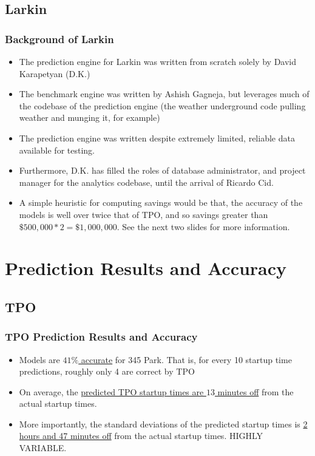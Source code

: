 \documentclass{beamer}
\begin{document}
\subsection{Larkin}
\begin{frame}
	\frametitle{Background of Larkin}
	\begin{itemize}
	\item The prediction engine for Larkin was written from scratch solely by David Karapetyan (D.K.)
	\item The benchmark engine was written by Ashish Gagneja, but leverages much of the codebase
		of the prediction engine (the weather underground code pulling weather and munging it, for example)
	\item The prediction engine was written despite extremely limited, reliable data available for testing.
	\item Furthermore, D.K. has filled the roles of database administrator, and project manager for the 
	analytics codebase, until the arrival of Ricardo Cid.
	\item A simple heuristic for computing savings would be that, the accuracy of the models is well over twice that of TPO, and so savings greater than $\$500,000 * 2 = \$1,000,000$. See the next two slides for more information.
\end{itemize}
\end{frame}

\section{Prediction Results and Accuracy}
\subsection{TPO}
\begin{frame}
\frametitle{TPO Prediction Results and Accuracy}
\begin{itemize}
	\item Models are \underline{$41\%$ accurate} for 345 Park. That is, for every 10 startup time predictions, roughly only 4 are correct by TPO
	\item On average, the \underline{predicted TPO startup times are $13$ minutes off} from the actual startup times.
\item More importantly, the standard deviations of the predicted startup times is 
	\underline{2 hours and 47 minutes off} from the actual startup times. HIGHLY VARIABLE.
\end{itemize}
\end{frame}
\end{document}
